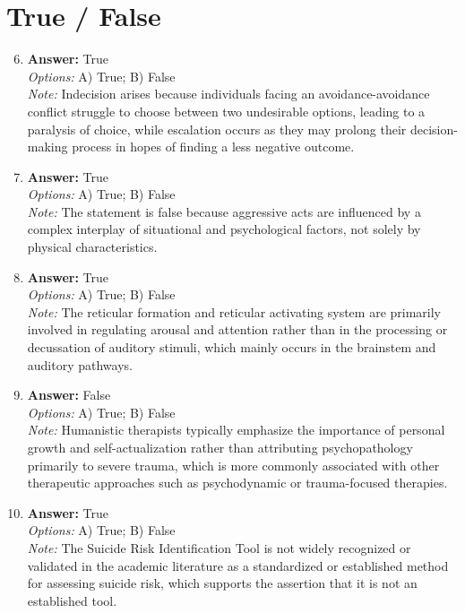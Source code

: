 \documentclass[12pt]{article}
\begin{document}
\section*{True / False}
\begin{enumerate}[label=\arabic*.]
\setcounter{enumi}{5}
\item \textbf{Answer:} True
\\ \textit{Options:} A) True; B) False
\\ \textit{Note:} Indecision arises because individuals facing an avoidance-avoidance conflict struggle to choose between two undesirable options, leading to a paralysis of choice, while escalation occurs as they may prolong their decision-making process in hopes of finding a less negative outcome.
\item \textbf{Answer:} True
\\ \textit{Options:} A) True; B) False
\\ \textit{Note:} The statement is false because aggressive acts are influenced by a complex interplay of situational and psychological factors, not solely by physical characteristics.
\item \textbf{Answer:} True
\\ \textit{Options:} A) True; B) False
\\ \textit{Note:} The reticular formation and reticular activating system are primarily involved in regulating arousal and attention rather than in the processing or decussation of auditory stimuli, which mainly occurs in the brainstem and auditory pathways.
\item \textbf{Answer:} False
\\ \textit{Options:} A) True; B) False
\\ \textit{Note:} Humanistic therapists typically emphasize the importance of personal growth and self-actualization rather than attributing psychopathology primarily to severe trauma, which is more commonly associated with other therapeutic approaches such as psychodynamic or trauma-focused therapies.
\item \textbf{Answer:} True
\\ \textit{Options:} A) True; B) False
\\ \textit{Note:} The Suicide Risk Identification Tool is not widely recognized or validated in the academic literature as a standardized or established method for assessing suicide risk, which supports the assertion that it is not an established tool.
\end{enumerate}
\end{document}
